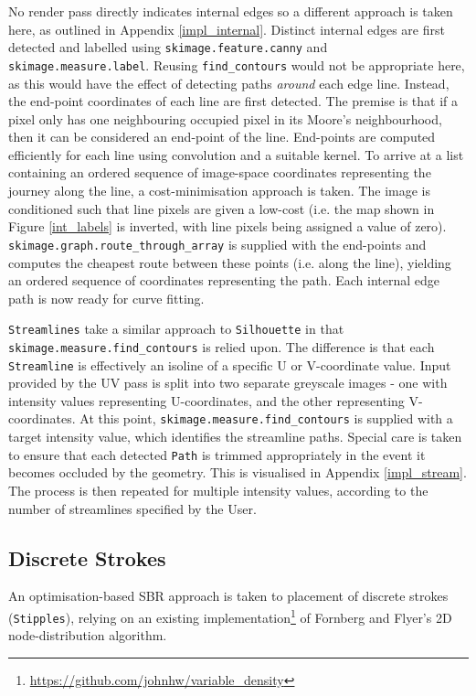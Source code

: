{No render pass directly indicates internal edges so a different approach is taken here, as outlined in Appendix \ref{impl_internal}.
Distinct internal edges are first detected \citep{saito1990} and labelled using \texttt{skimage.feature.canny} and \texttt{skimage.measure.label}. Reusing \texttt{find\_contours} would not be appropriate here, as this would have the effect of detecting paths \emph{around} each edge line.
Instead, the end-point coordinates of each line are first detected.
The premise is that if a pixel only has one neighbouring occupied pixel in its Moore's neighbourhood, then it can be considered an end-point of the line.
End-points are computed efficiently for each line using convolution and a suitable kernel.
To arrive at a list containing an ordered sequence of image-space coordinates representing the journey along the line, a cost-minimisation approach is taken.
The image is conditioned such that line pixels are given a low-cost (i.e. the map shown in Figure \ref{int_labels} is inverted, with line pixels being assigned a value of zero).
\texttt{skimage.graph.route\_through\_array} is supplied with the end-points and computes the cheapest route between these points (i.e. along the line), yielding an ordered sequence of coordinates representing the path.
Each internal edge path is now ready for curve fitting.

\texttt{Streamlines} take a similar approach to \texttt{Silhouette} in that \texttt{skimage.measure.find\_contours} is relied upon.
The difference is that each \texttt{Streamline} is effectively an isoline of a specific U or V-coordinate value.
Input provided by the UV pass is split into two separate greyscale images - one with intensity values representing U-coordinates, and the other representing V-coordinates.
At this point, \texttt{skimage.measure.find\_contours} is supplied with a target intensity value, which identifies the streamline paths.
Special care is taken to ensure that each detected \texttt{Path} is trimmed appropriately in the event it becomes occluded by the geometry.
This is visualised in Appendix \ref{impl_stream}.
The process is then repeated for multiple intensity values, according to the number of streamlines specified by the User.

\subsection{Discrete Strokes}

An optimisation-based SBR approach is taken to placement of discrete strokes (\texttt{Stipples}), relying on an existing implementation\footnote{\url{https://github.com/johnhw/variable_density}} of Fornberg and Flyer's \citep{fornberg2015} 2D node-distribution algorithm.

}
